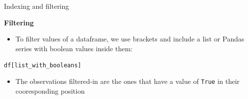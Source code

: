 \documentclass[aspectratio=169]{beamer}
\begin{document}
\begin{frame}{Indexing and filtering}

	\textbf{Filtering}

	\begin{itemize}
		\item To filter values of a dataframe, we use brackets and include a list or Pandas series with boolean values inside them:
	\end{itemize}

	\hspace{7mm} \texttt{df[list\_with\_booleans]}

	\begin{itemize}	
		\item The observations filtered-in are the ones that have a value of \texttt{True} in their cooresponding position
	\end{itemize}

\end{frame}
\end{document}
